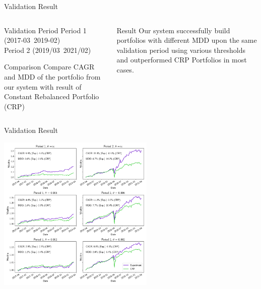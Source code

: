 \begin{frame}{Validation Result}

\begin{columns}[t]
\begin{column}{0.5\textwidth}
\begin{block}{Validation Period}
Period 1 (2017-03~2019-02) 
\\
Period 2 (2019/03~2021/02)
\end{block}
\begin{block}{Comparison}
Compare CAGR and MDD of the portfolio from our system with result of Constant Rebalanced Portfolio (CRP)
\end{block}
\end{column}

\begin{column}{0.5\textwidth}
\begin{block}{Result}
Our system successfully build portfolios with different MDD upon the same validation period using various thresholds and outperformed CRP Portfolios in most cases.
\end{block}
\end{column}
\end{columns}
\end{frame}

\begin{frame}{Validation Result}
\begin{center}
\includegraphics[height= 7.5cm]{images/crp_compare.png}
\end{center}

\end{frame}